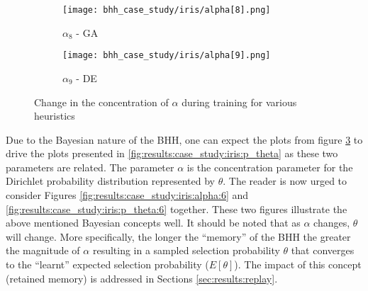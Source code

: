 \begin{figure}[htbp]
	\par\bigskip
	\begin{subfigure}{0.5\textwidth}
		\centering
		\texttt{[image: bhh\_case\_study/iris/alpha[8].png]}
		\caption{$\alpha_{8}$ - \Acs{GA}}
		\label{fig:results:case_study:iris:alpha:8}
	\end{subfigure}
	\begin{subfigure}{0.5\textwidth}
		\centering
		\texttt{[image: bhh\_case\_study/iris/alpha[9].png]}
		\caption{$\alpha_{9}$ - \Acs{DE}}
		\label{fig:results:case_study:iris:alpha:9}
	\end{subfigure}
	\par\bigskip
	\caption{Change in the concentration of $\alpha$ during training for various heuristics}
	\label{fig:results:case_study:iris:alpha}
\end{figure}

Due to the Bayesian nature of the \Acs{BHH}, one can expect the plots from figure \ref{fig:results:case_study:iris:alpha} to drive the plots presented in \ref{fig:results:case_study:iris:p_theta} as these two parameters are related. The parameter $\alpha$ is the concentration parameter for the Dirichlet probability distribution represented by $\theta$. The reader is now urged to consider Figures \ref{fig:results:case_study:iris:alpha:6} and \ref{fig:results:case_study:iris:p_theta:6} together. These two figures illustrate the above mentioned Bayesian concepts well. It should be noted that as $\alpha$ changes, $\theta$ will change. More specifically, the longer the ``memory'' of the \Acs{BHH} the greater the magnitude of $\alpha$ resulting in a sampled selection probability $\theta$ that converges to the ``learnt'' expected selection probability ($E\left[\theta\right]$). The impact of this concept (retained memory) is addressed in Sections \ref{sec:results:replay}.

